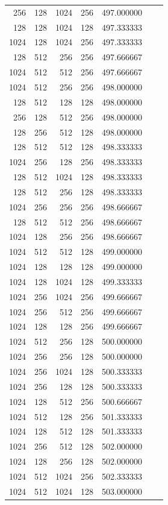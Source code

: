 \documentclass{article}
\begin{document}
{\begin{longtable}{rrrrrrr}
256 & 128 & 1024 & 256 & 497.000000 \\
128 & 128 & 1024 & 128 & 497.333333 \\
1024 & 128 & 1024 & 256 & 497.333333 \\
128 & 512 & 256 & 256 & 497.666667 \\
1024 & 512 & 512 & 256 & 497.666667 \\
1024 & 512 & 256 & 256 & 498.000000 \\
128 & 512 & 128 & 128 & 498.000000 \\
256 & 128 & 512 & 256 & 498.000000 \\
128 & 256 & 512 & 128 & 498.000000 \\
128 & 512 & 512 & 128 & 498.333333 \\
1024 & 256 & 128 & 256 & 498.333333 \\
128 & 512 & 1024 & 128 & 498.333333 \\
128 & 512 & 256 & 128 & 498.333333 \\
1024 & 256 & 256 & 256 & 498.666667 \\
128 & 512 & 512 & 256 & 498.666667 \\
1024 & 128 & 256 & 256 & 498.666667 \\
1024 & 512 & 512 & 128 & 499.000000 \\
1024 & 128 & 128 & 128 & 499.000000 \\
1024 & 128 & 1024 & 128 & 499.333333 \\
1024 & 256 & 1024 & 256 & 499.666667 \\
1024 & 256 & 512 & 256 & 499.666667 \\
1024 & 128 & 128 & 256 & 499.666667 \\
1024 & 512 & 256 & 128 & 500.000000 \\
1024 & 256 & 256 & 128 & 500.000000 \\
1024 & 256 & 1024 & 128 & 500.333333 \\
1024 & 256 & 128 & 128 & 500.333333 \\
1024 & 128 & 512 & 256 & 500.666667 \\
1024 & 512 & 128 & 256 & 501.333333 \\
1024 & 128 & 512 & 128 & 501.333333 \\
1024 & 256 & 512 & 128 & 502.000000 \\
1024 & 128 & 256 & 128 & 502.000000 \\
1024 & 512 & 1024 & 256 & 502.333333 \\
1024 & 512 & 1024 & 128 & 503.000000 \\

\end{longtable}}
\end{document}
